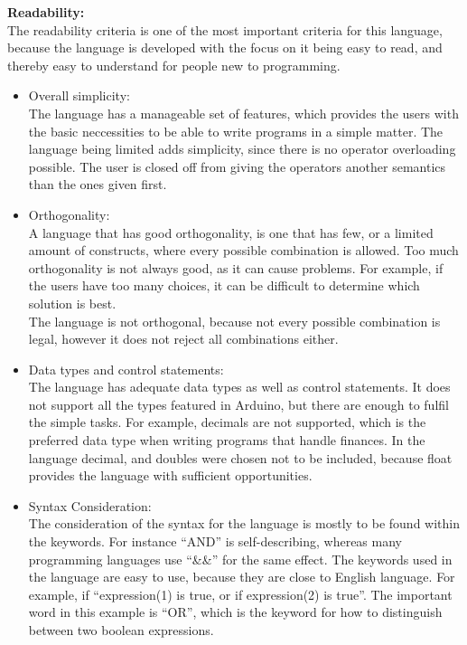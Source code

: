 \textbf{Readability:} \\
The readability criteria is one of the most important criteria for this language, because the language is developed with the focus on it being easy to read, and thereby easy to understand for people new to programming. \\
\begin{itemize}
\item Overall simplicity:\\
The language has a manageable set of features, which provides the users with the basic neccessities to be able to write programs in a simple matter. The language being limited adds simplicity, since there is no operator overloading possible. The user is closed off from giving the operators another semantics than the ones given first. 
\item Orthogonality:\\
A language that has good orthogonality, is one that has few, or a limited amount of constructs, where every possible combination is allowed. Too much orthogonality is not always good, as it can cause problems. For example, if the users have too many choices, it can be difficult to determine which solution is best.\\
The language is not orthogonal, because not every possible combination is legal, however it does not reject all combinations either.  
\item Data types and control statements:\\
The language has adequate data types as well as control statements. It does not support all the types featured in Arduino, but there are enough to fulfil the simple tasks. For example, decimals are not supported, which is the preferred data type when writing programs that handle finances. In the language decimal, and doubles were chosen not to be included, because float provides the language with sufficient opportunities.
\item Syntax Consideration:\\
The consideration of the syntax for the language is mostly to be found within the keywords. For instance ``AND'' is self-describing, whereas many programming languages use ``\&\&'' for the same effect. The keywords used in the language are easy to use, because they are close to English language. For example, if ``expression(1) is true, or if expression(2) is true''. The important word in this example is ``OR'', which is the keyword for how to distinguish between two boolean expressions.
\end{itemize}
